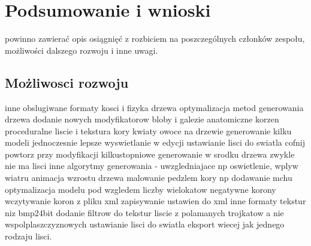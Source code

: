 

\chapter{Podsumowanie i wnioski}
powinno zawierać opis osiągnięć z rozbiciem na poszczególnych
członków zespołu, możliwości dalszego rozwoju i inne uwagi.
\section{Możliwosci rozwoju}
inne obslugiwane formaty
kosci i fizyka drzewa
optymalizacja metod generowania drzewa
dodanie nowych modyfikatorow
bloby i galezie anatomiczne
korzen
proceduralne liscie i tekstura kory
kwiaty owoce na drzewie
generowanie kilku modeli jednoczesnie
lepsze wyswietlanie w edycji
ustawianie lisci do swiatla
cofnij powtorz przy modyfikacji
kilkustopniowe generowanie
w srodku drzewa zwykle nie ma lisci 
inne algorytmy generowania  - uwzgledniajace np oswietlenie, wplyw wiatru
animacja wzrostu drzewa
malowanie pedzlem kory np dodawanie mchu
optymalizacja modelu pod wzgledem liczby wielokatow
negatywne korony
wczytywanie koron z pliku xml
zapisywanie ustawien do xml
inne formaty tekstur niz bmp24bit
dodanie filtrow do tekstur
liscie z polamanych trojkatow a nie wspolplaszczyznowych
ustawianie lisci do swiatla
eksport wiecej jak jednego rodzaju lisci.
